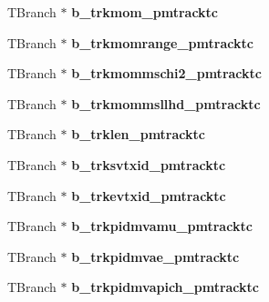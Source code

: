 \begin{DoxyCompactItemize}
\item 
\hypertarget{classanatree_a782d889f8b5fd1d352b9b4d352f84da5}{T\-Branch $\ast$ {\bfseries b\-\_\-trkmom\-\_\-pmtracktc}}\label{classanatree_a782d889f8b5fd1d352b9b4d352f84da5}

\item 
\hypertarget{classanatree_af743e149aff2e5acfebeaa5eb5678f2e}{T\-Branch $\ast$ {\bfseries b\-\_\-trkmomrange\-\_\-pmtracktc}}\label{classanatree_af743e149aff2e5acfebeaa5eb5678f2e}

\item 
\hypertarget{classanatree_a52bb4b42ce9fd4bb175aa0a3c167cea5}{T\-Branch $\ast$ {\bfseries b\-\_\-trkmommschi2\-\_\-pmtracktc}}\label{classanatree_a52bb4b42ce9fd4bb175aa0a3c167cea5}

\item 
\hypertarget{classanatree_a038535f7a00f8049c3306b2119740fb3}{T\-Branch $\ast$ {\bfseries b\-\_\-trkmommsllhd\-\_\-pmtracktc}}\label{classanatree_a038535f7a00f8049c3306b2119740fb3}

\item 
\hypertarget{classanatree_a7636779ee5c4ddab49691d7521b58b16}{T\-Branch $\ast$ {\bfseries b\-\_\-trklen\-\_\-pmtracktc}}\label{classanatree_a7636779ee5c4ddab49691d7521b58b16}

\item 
\hypertarget{classanatree_a802135c7ee1cf361df7b99cf3207c32f}{T\-Branch $\ast$ {\bfseries b\-\_\-trksvtxid\-\_\-pmtracktc}}\label{classanatree_a802135c7ee1cf361df7b99cf3207c32f}

\item 
\hypertarget{classanatree_af64608e06d4076adbcf587984592b2c5}{T\-Branch $\ast$ {\bfseries b\-\_\-trkevtxid\-\_\-pmtracktc}}\label{classanatree_af64608e06d4076adbcf587984592b2c5}

\item 
\hypertarget{classanatree_a394abe52ad153a5137d9dca3e4b56ec1}{T\-Branch $\ast$ {\bfseries b\-\_\-trkpidmvamu\-\_\-pmtracktc}}\label{classanatree_a394abe52ad153a5137d9dca3e4b56ec1}

\item 
\hypertarget{classanatree_afbc92e232adad53f05343e58a8eeaa3c}{T\-Branch $\ast$ {\bfseries b\-\_\-trkpidmvae\-\_\-pmtracktc}}\label{classanatree_afbc92e232adad53f05343e58a8eeaa3c}

\item 
\hypertarget{classanatree_a1ad2a2007476b2b42c034b99317105ac}{T\-Branch $\ast$ {\bfseries b\-\_\-trkpidmvapich\-\_\-pmtracktc}}\label{classanatree_a1ad2a2007476b2b42c034b99317105ac}


\end{DoxyCompactItemize}
